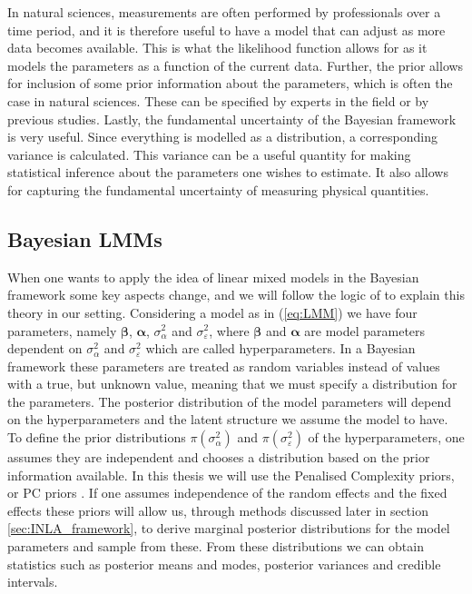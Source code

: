 In natural sciences, measurements are often performed by professionals over a time period, and it is therefore useful to have a model that can adjust as more data becomes available. This is what the likelihood function allows for as it models the parameters as a function of the current data.
Further, the prior allows for inclusion of some prior information about the parameters, which is often the case in natural sciences. These can be specified by experts in the field or by previous studies. Lastly, the fundamental uncertainty of the Bayesian framework is very useful.
Since everything is modelled as a distribution, a corresponding variance is calculated. This variance can be a useful quantity for making statistical inference about the parameters one wishes to estimate. It also allows for capturing the fundamental uncertainty of measuring physical quantities. 

\subsection{Bayesian LMMs}
When one wants to apply the idea of linear mixed models in the Bayesian framework some key aspects change, and we will follow the logic of \citet{gelman2015Bayesian} to explain this theory in our setting. Considering a model as in (\ref{eq:LMM}) we have four parameters, namely $\boldsymbol{\beta}$, $\boldsymbol{\alpha}$, $\sigma^2_{\alpha}$ and $\sigma^2_{\varepsilon}$, where $\boldsymbol{\beta}$ and $\boldsymbol{\alpha}$ are model parameters dependent on $\sigma^2_{\alpha}$ and $\sigma^2_{\varepsilon}$ which are called hyperparameters.
In a Bayesian framework these parameters are treated as random variables instead of values with a true, but unknown value, meaning that we must specify a distribution for the parameters. The posterior distribution of the model parameters will depend on the hyperparameters and the latent structure we assume the model to have. To define the prior distributions $\pi(\sigma^2_{\alpha})$ and $\pi(\sigma^2_{\varepsilon})$ of the hyperparameters, one assumes they are independent and chooses a distribution based on the prior information available. In this thesis we will use the Penalised Complexity priors, or PC priors \citep{simpson2017penalising}.
If one assumes independence of the random effects and the fixed effects these priors will allow us, through methods discussed later in section \ref{sec:INLA_framework}, to derive marginal posterior distributions for the model parameters and sample from these. From these distributions we can obtain statistics such as posterior means and modes, posterior variances and credible intervals.
 


